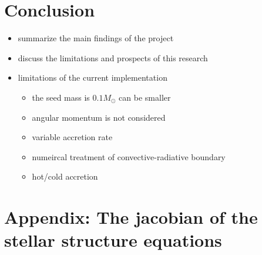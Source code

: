 \documentclass[12pt,a4paper]{article}
\newcommand{\pfird}[2][]{\frac{\partial#1}{\partial#2}}
\newenvironment{outline}[1]{%
  \begin{itemize}[label=\textbullet]%
  \color{#1}%
}{%
  \end{itemize}%
}
\begin{document}

\section{Conclusion}
\label{sec:conclusion}

\begin{outline}{gray}
  \item summarize the main findings of the project
  \item discuss the limitations and prospects of this research
  \item limitations of the current implementation
  \begin{itemize}
    \item the seed mass is $0.1 M_\odot$ can be smaller
    \item angular momentum is not considered
    \item variable accretion rate
    \item numeircal treatment of convective-radiative boundary
    \item hot/cold accretion
  \end{itemize}
\end{outline}


\newpage
\printbibliography[heading=bibintoc, title={References}]

\newpage
\appendix
\section{Appendix: The jacobian of the stellar structure equations}
\label{sec:appendix_jacobian}
\end{document}
